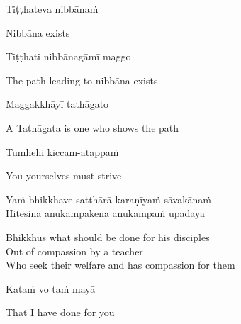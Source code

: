 \begin{twochants}
  Tiṭṭhateva nibbānaṁ
\end{twochants}

\begin{english}
  Nibbāna exists
\end{english}

\begin{twochants}
  Tiṭṭhati nibbānagāmī maggo
\end{twochants}

\begin{english}
  The path leading to nibbāna exists
\end{english}

\begin{twochants}
  Maggakkhāyī tathāgato
\end{twochants}

\begin{english}
  A Tathāgata is one who shows the path
\end{english}

\suttaRef{[MN 107]}

\begin{twochants}
  Tumhehi kiccam-ātappaṁ
\end{twochants}

\begin{english}
  You yourselves must strive
\end{english}

\suttaRef{[Dhp 276]}

\begin{twochants}
  Yaṁ bhikkhave satthārā karaṇīyaṁ sāvakānaṁ\\
  Hitesinā anukampakena anukampaṁ upādāya\\
\end{twochants}

\begin{english-verses}
  Bhikkhus what should be done for his disciples\\
  Out of compassion by a teacher\\
  Who seek their welfare and has compassion for them
\end{english-verses}

\begin{twochants}
  Kataṁ vo taṁ mayā
\end{twochants}

\begin{english}
  That I have done for you
\end{english}


